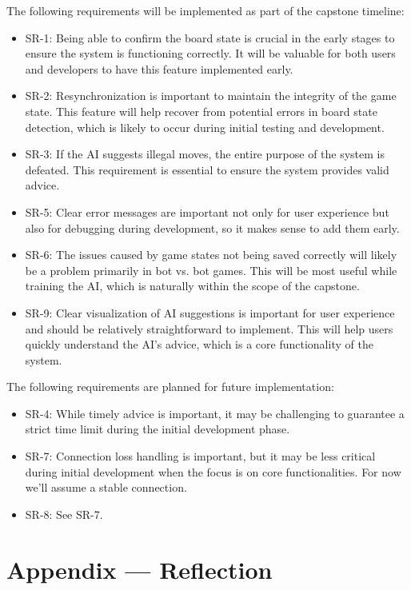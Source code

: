 \documentclass{article}
\begin{document}
The following requirements will be implemented as part of the capstone timeline:
\begin{itemize}
    \item SR-1: Being able to confirm the board state is crucial in the early stages to ensure the system is functioning correctly.
          It will be valuable for both users and developers to have this feature implemented early.
    \item SR-2: Resynchronization is important to maintain the integrity of the game state.
          This feature will help recover from potential errors in board state detection, which is likely to occur during initial testing and development.
    \item SR-3: If the AI suggests illegal moves, the entire purpose of the system is defeated.
          This requirement is essential to ensure the system provides valid advice.
    \item SR-5: Clear error messages are important not only for user experience but also for debugging during development, so it makes sense to add them early.
    \item SR-6: The issues caused by game states not being saved correctly will likely be a problem primarily in bot vs. bot games.
          This will be most useful while training the AI, which is naturally within the scope of the capstone.
    \item SR-9: Clear visualization of AI suggestions is important for user experience and should be relatively straightforward to implement.
          This will help users quickly understand the AI's advice, which is a core functionality of the system.
\end{itemize}

The following requirements are planned for future implementation:
\begin{itemize}
    \item SR-4: While timely advice is important, it may be challenging to guarantee a strict time limit during the initial development phase.
    \item SR-7: Connection loss handling is important, but it may be less critical during initial development when the focus is on core functionalities.
          For now we'll assume a stable connection.
    \item SR-8: See SR-7.
\end{itemize}


\newpage{}

\section*{Appendix --- Reflection}
\end{document}
